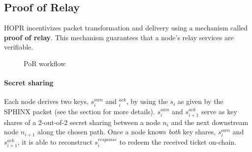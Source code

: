 \subsection{Proof of Relay}
\label{sec:incentives:proofofrelay}

HOPR incentivizes packet transformation and delivery using a mechanism called \textbf{proof of relay}. This mechanism guarantees that a node's relay services are verifiable.

\begin{figure}[H]
      \centering
      \caption{PoR workflow}
\end{figure}
\paragraph{Secret sharing}
\label{sec:incentives:proofofrelay:secretSharing}

Each node derives two keys, $s_i^{own}$ and $_i^{ack}$, by using the $s_i$ as given by the SPHINX packet (see the  section for more details). $s_i^{own}$ and $s_{i+1}^{ack}$ serve as key shares of a 2-out-of-2 secret sharing between a node $n_i$ and the next downstream node $n_{i+1}$ along the chosen path. Once a node knows \textit{both} key shares, $s_i^{own}$ and $s_{i+1}^{ack}$, it is able to reconstruct $s_i^{response}$ to redeem the received ticket on-chain.

